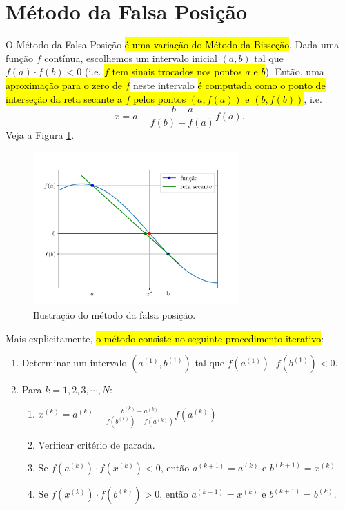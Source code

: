 \section{Método da Falsa Posição}\label{cap_eq1d_sec_falsapos}

O Método da Falsa Posição \hl{é uma variação do Método da Bisseção}. Dada uma função $f$ contínua, escolhemos um intervalo inicial $(a, b)$ tal que $f(a)\cdot f(b) < 0$ (i.e. \hl{$f$ tem sinais trocados nos pontos $a$ e $b$}). Então, uma \hl{aproximação para o zero de $f$} neste intervalo \hl{é computada como o ponto de interseção da reta secante a $f$ pelos pontos $(a, f(a))$ e $(b, f(b))$}, i.e.
\begin{equation}
  x = a - \frac{b-a}{f(b)-f(a)}f(a).
\end{equation}
Veja a Figura \ref{cap_eq1d_sec_falsapos:fig:falsapos}.

\begin{figure}[H]
  \centering
  \includegraphics[width=0.7\textwidth]{./cap_eq1d/dados/fig_falsapos/fig}
  \caption{Ilustração do método da falsa posição.}
  \label{cap_eq1d_sec_falsapos:fig:falsapos}
\end{figure}

Mais explicitamente, \hl{o método consiste no seguinte procedimento iterativo}:
\begin{enumerate}
\item Determinar um intervalo $(a^{(1)}, b^{(1)})$ tal que $f(a^{(1)})\cdot f(b^{(1)}) < 0$.
\item Para $k = 1, 2, 3, \cdots, N$:
  \begin{enumerate}[2.1]
  \item $\displaystyle x^{(k)} = a^{(k)} - \frac{b^{(k)}-a^{(k)}}{f(b^{(k)})-f(a^{(k)})}f(a^{(k)})$
  \item Verificar critério de parada.
  \item Se $f(a^{(k)})\cdot f(x^{(k)}) < 0$, então $a^{(k+1)}=a^{(k)}$ e $b^{(k+1)}=x^{(k)}$.
  \item Se $f(x^{(k)})\cdot f(b^{(k)}) > 0$, então $a^{(k+1)}=x^{(k)}$ e $b^{(k+1)}=b^{(k)}$.
  \end{enumerate}
\end{enumerate}

